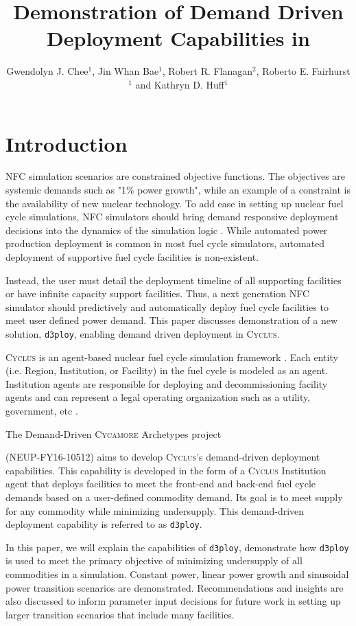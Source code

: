 \documentclass{anstrans}
\title{Demonstration of Demand Driven Deployment Capabilities in \Cyclus}
\author{Gwendolyn J. Chee$^1$, Jin Whan Bae$^1$, Robert R. Flanagan$^2$, Roberto E. Fairhurst$^1$ and Kathryn D. Huff$^1$}
\institute{
$^1$Dept. of Nuclear, Plasma and Radiological Engineering, University of Illinois at Urbana-Champaign \\
$^2$Nuclear Engineering Program, University of South Carolina \\

gchee2@illinois.edu
}
\newcommand{\Cyclus}{\textsc{Cyclus}\xspace}%
\newcommand{\Cycamore}{\textsc{Cycamore}\xspace}%
\newcommand{\deploy}{\texttt{d3ploy}\xspace}%
\begin{document}
\section{Introduction}
\gls{NFC} simulation scenarios are constrained objective functions. 
The objectives are systemic demands such as "1\% power growth", 
while an example of a constraint is the availability of new nuclear 
technology. 
To add ease in setting up nuclear fuel cycle simulations, \gls{NFC}
simulators should bring demand responsive deployment decisions into 
the dynamics of the simulation logic \cite{huff_current_2017}. 
While automated power production deployment is common in most fuel 
cycle simulators, automated deployment of supportive fuel cycle 
facilities is non-existent. 

Instead, the user must detail the deployment timeline of all 
supporting facilities or have infinite capacity support facilities. 
Thus, a next generation \gls{NFC} simulator should predictively and 
automatically deploy fuel cycle facilities to meet user defined 
power demand. 
This paper discusses demonstration of a new solution, 
\texttt{d3ploy}, enabling demand driven deployment in \Cyclus. 

\Cyclus is an agent-based nuclear fuel cycle simulation framework 
\cite{huff_fundamental_2016}. 
Each entity (i.e. Region, Institution, or Facility) in the fuel 
cycle is modeled as an agent. 
Institution agents
are responsible for deploying and decommissioning facility agents 
and can represent a legal operating organization such as a 
utility, government, etc \cite{huff_fundamental_2016}. 

The Demand-Driven \Cycamore Archetypes project 

\noindent
(NEUP-FY16-10512) 
aims to develop \Cyclus's demand-driven deployment capabilities. 
This capability is developed in the form of a \Cyclus Institution
agent that deploys facilities to meet the front-end and back-end 
fuel cycle demands based on a user-defined commodity demand. 
Its goal is to meet supply for any commodity while minimizing 
undersupply.
This demand-driven deployment capability is referred to as 
\deploy. 

In this paper, we will explain the capabilities of \deploy, 
demonstrate how \deploy is used
to meet the primary objective of minimizing undersupply of all 
commodities in a simulation. 
Constant power, linear power growth and sinusoidal power
transition scenarios are demonstrated. 
Recommendations and insights are also discussed to inform parameter 
input decisions for future work in setting up 
larger transition scenarios that include many facilities. 
\end{document}
